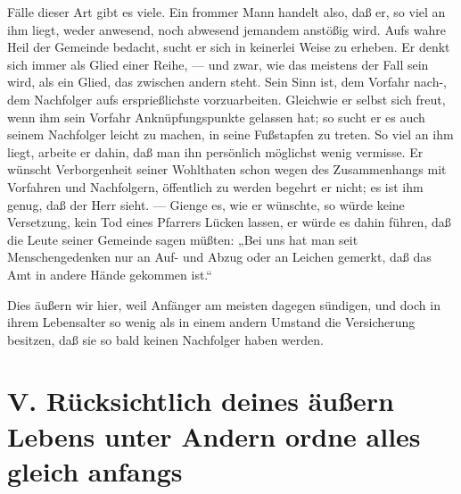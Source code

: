 Fälle dieser Art gibt es viele. Ein frommer Mann handelt also, daß er, so viel an ihm liegt, weder anwesend, noch abwesend jemandem anstößig wird. Aufs wahre Heil der Gemeinde bedacht, sucht er sich in keinerlei Weise zu erheben. Er denkt sich immer als Glied einer Reihe, — und zwar, wie das meistens der Fall sein wird, als ein Glied, das zwischen andern steht. Sein Sinn ist, dem Vorfahr nach-, dem Nachfolger aufs ersprießlichste vorzuarbeiten. Gleichwie er selbst sich freut, wenn ihm sein Vorfahr Anknüpfungspunkte gelassen hat; so sucht er es auch seinem Nachfolger leicht zu machen, in seine Fußstapfen
zu treten. So viel an ihm liegt, arbeite er dahin, daß man ihn persönlich möglichst wenig vermisse. Er wünscht Verborgenheit seiner Wohlthaten schon wegen des Zusammenhangs mit Vorfahren und Nachfolgern, öffentlich zu werden begehrt er nicht; es ist ihm genug, daß der Herr sieht. — Gienge es, wie er wünschte, so würde keine Versetzung, kein Tod eines Pfarrers Lücken lassen, er würde es dahin führen, daß die Leute seiner Gemeinde sagen müßten: „Bei uns hat man seit Menschengedenken nur an Auf- und Abzug oder an Leichen gemerkt, daß das Amt in andere Hände gekommen ist.“

Dies äußern wir hier, weil Anfänger am meisten dagegen sündigen, und doch in ihrem Lebensalter so wenig als in einem andern Umstand die Versicherung besitzen, daß sie so bald keinen Nachfolger haben werden.

\section[V. Rücksichtlich deines äußern Lebens]{V. Rücksichtlich deines äußern Lebens unter Andern ordne alles gleich anfangs}

